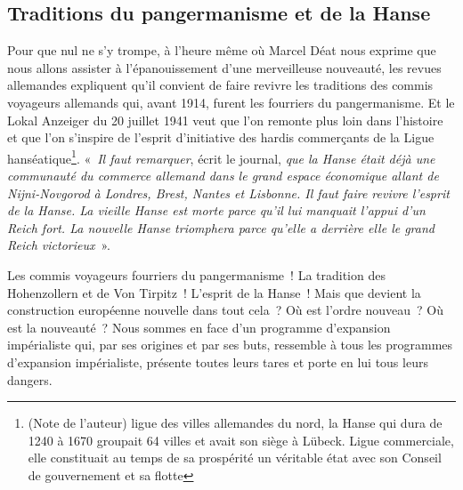 \documentclass[french,twoside]{book} %
\begin{document}
\subsection[Traditions du pangermanisme et de la Hanse]{Traditions du pangermanisme et de la Hanse}
\noindent Pour que nul ne s’y trompe, à l’heure même où Marcel Déat nous exprime que nous allons assister à l’épanouissement d’une merveilleuse nouveauté, les revues allemandes expliquent qu’il convient de faire revivre les traditions des commis voyageurs allemands qui, avant 1914, furent les fourriers du pangermanisme. Et le Lokal Anzeiger du 20 juillet 1941 veut que l’on remonte plus loin dans l’histoire et que l’on s’inspire de l’esprit d’initiative des hardis commerçants de la Ligue hanséatique\footnote{(Note de l’auteur) ligue des villes allemandes du nord, la Hanse qui dura de 1240 à 1670 groupait 64 villes et avait son siège à Lübeck. Ligue commerciale, elle constituait au temps de sa prospérité un véritable état avec son Conseil de gouvernement et sa flotte}. « \emph{Il faut remarquer}, écrit le journal, \emph{que la Hanse était déjà une communauté du commerce allemand dans le grand espace économique allant de Nijni-Novgorod à Londres, Brest, Nantes et Lisbonne. Il faut faire revivre l’esprit de la Hanse. La vieille Hanse est morte parce qu’il lui manquait l’appui d’un Reich fort. La nouvelle Hanse triomphera parce qu’elle a derrière elle le grand Reich victorieux} ».\par
Les commis voyageurs fourriers du pangermanisme ! La tradition des Hohenzollern et de Von Tirpitz ! L’esprit de la Hanse ! Mais que devient la construction européenne nouvelle dans tout cela ? Où est l’ordre nouveau ? Où est la nouveauté ? Nous sommes en face d’un programme d’expansion impérialiste qui, par ses origines et par ses buts, ressemble à tous les programmes d’expansion impérialiste, présente toutes leurs tares et porte en lui tous leurs dangers.
\end{document}
